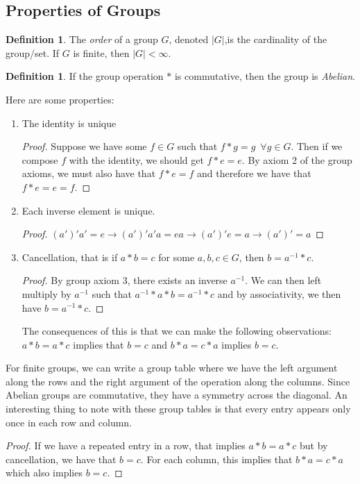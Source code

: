 \documentclass{article}
\theoremstyle{definition}
\newtheorem{definition}[theorem]{Definition}
\begin{document}
\subsection{Properties of Groups}
\begin{definition}
    The \emph{order} of a group $G$, denoted $|G|$,is the cardinality of the group/set. If $G$ is finite, then $|G|<\infty$.
\end{definition}
\begin{definition}
    If the group operation $*$ is commutative, then the group is \emph{Abelian}.
\end{definition}
Here are some properties:
\begin{enumerate}
    \item The identity is unique 
    \begin{proof}
        Suppose we have some $f\in G$ such that $f*g=g \,\,\, \forall g\in G$. Then if we compose $f$ with the identity, we should get $f*e =e$. By axiom 2 of the group axioms, we must also have that $f*e=f$ and therefore we have that $f*e=e=f$.
    \end{proof}
    \item Each inverse element is unique. 
    \begin{proof}
        $(a')'a'=e\rightarrow (a')'a'a=ea\rightarrow (a')'e=a\rightarrow (a')'=a$
    \end{proof}
    \item Cancellation, that is if $a*b=c$ for some $a,b,c\in G$, then $b=a^{-1}*c$. 
    \begin{proof}
        By group axiom 3, there exists an inverse $a^{-1}$. We can then left multiply by $a^{-1}$ such that $a^{-1}*a*b=a^{-1}*c$ and by associativity, we then have $b=a^{-1}*c$.
    \end{proof}
    The consequences of this is that we can make the following observations: $a*b=a*c$ implies that $b=c$ and $b*a=c*a$ implies $b=c$.
\end{enumerate}
For finite groups, we can write a group table where we have the left argument along the rows and the right argument of the operation along the columns. Since Abelian groups are commutative, they have a symmetry across the diagonal. An interesting thing to note with these group tables is that every entry appears only once in each row and column.
\begin{proof}
    If we have a repeated entry in a row, that implies $a*b=a*c$ but by cancellation, we have that $b=c$. For each column, this implies that $b*a=c*a$ which also implies $b=c$.
\end{proof}
\end{document}
